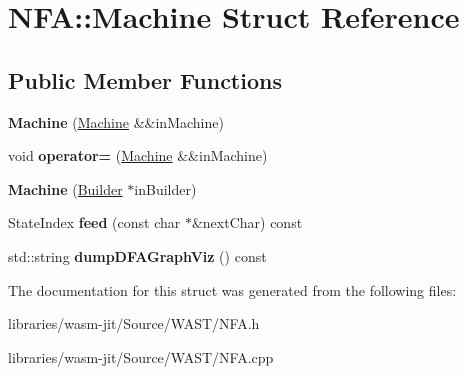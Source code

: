 \hypertarget{struct_n_f_a_1_1_machine}{}\section{N\+FA\+:\+:Machine Struct Reference}
\label{struct_n_f_a_1_1_machine}
\subsection*{Public Member Functions}
\begin{DoxyCompactItemize}
\item 
\mbox{\label{struct_n_f_a_1_1_machine_a3c0894e9d58ea05fd1f661f62ba1977e}} 
{\bfseries Machine} (\mbox{\hyperlink{struct_n_f_a_1_1_machine}{Machine}} \&\&in\+Machine)
\item 
\mbox{\label{struct_n_f_a_1_1_machine_a55bd24b045cbffa05e7a1f42f10e27bf}} 
void {\bfseries operator=} (\mbox{\hyperlink{struct_n_f_a_1_1_machine}{Machine}} \&\&in\+Machine)
\item 
\mbox{\label{struct_n_f_a_1_1_machine_ac1749776fcebcac9bd88ead152efbd50}} 
{\bfseries Machine} (\mbox{\hyperlink{struct_n_f_a_1_1_builder}{Builder}} $\ast$in\+Builder)
\item 
\mbox{\label{struct_n_f_a_1_1_machine_ac25347ea5e9d318f6ac499af40e7b77b}} 
State\+Index {\bfseries feed} (const char $\ast$\&next\+Char) const
\item 
\mbox{\label{struct_n_f_a_1_1_machine_a97de1223997c8844b4b56e9e24884e87}} 
std\+::string {\bfseries dump\+D\+F\+A\+Graph\+Viz} () const
\end{DoxyCompactItemize}


The documentation for this struct was generated from the following files\+:\begin{DoxyCompactItemize}
\item 
libraries/wasm-\/jit/\+Source/\+W\+A\+S\+T/N\+F\+A.\+h\item 
libraries/wasm-\/jit/\+Source/\+W\+A\+S\+T/N\+F\+A.\+cpp\end{DoxyCompactItemize}

